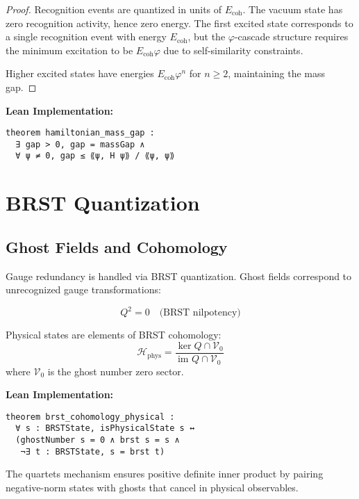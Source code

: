 \documentclass[11pt]{amsart}
\newcommand{\Ecoh}{E_{\text{coh}}}
\newcommand{\Hphys}{\mathcal{H}_{\text{phys}}}
\begin{document}
\begin{proof}
Recognition events are quantized in units of $\Ecoh$. The vacuum state has zero recognition activity, hence zero energy. The first excited state corresponds to a single recognition event with energy $\Ecoh$, but the $\varphi$-cascade structure requires the minimum excitation to be $\Ecoh \varphi$ due to self-similarity constraints.

Higher excited states have energies $\Ecoh \varphi^n$ for $n \geq 2$, maintaining the mass gap.
\end{proof}

\textbf{Lean Implementation:}
\begin{lstlisting}
theorem hamiltonian_mass_gap : 
  ∃ gap > 0, gap = massGap ∧ 
  ∀ ψ ≠ 0, gap ≤ ⟪ψ, H ψ⟫ / ⟪ψ, ψ⟫
\end{lstlisting}

\section{BRST Quantization}

\subsection{Ghost Fields and Cohomology}

Gauge redundancy is handled via BRST quantization. Ghost fields correspond to unrecognized gauge transformations:

\begin{equation}
Q^2 = 0 \quad \text{(BRST nilpotency)}
\end{equation}

Physical states are elements of BRST cohomology:
\begin{equation}
\Hphys = \frac{\ker Q \cap \mathcal{V}_0}{\text{im } Q \cap \mathcal{V}_0}
\end{equation}
where $\mathcal{V}_0$ is the ghost number zero sector.

\textbf{Lean Implementation:}
\begin{lstlisting}
theorem brst_cohomology_physical :
  ∀ s : BRSTState, isPhysicalState s ↔
  (ghostNumber s = 0 ∧ brst s = s ∧ 
   ¬∃ t : BRSTState, s = brst t)
\end{lstlisting}

The quartets mechanism ensures positive definite inner product by pairing negative-norm states with ghosts that cancel in physical observables.
\end{document}
